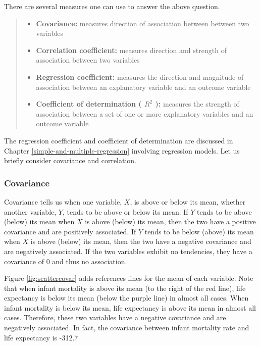 \documentclass[
]{book}
\providecommand{\tightlist}{%
  \setlength{\itemsep}{0pt}\setlength{\parskip}{0pt}}
\begin{document}
There are several measures one can use to answer the above question.

\begin{quote}
\begin{itemize}
\tightlist
\item
  \textbf{Covariance:} measures direction of association between between two variables
\item
  \textbf{Correlation coefficient:} measures direction and strength of association between two variables
\item
  \textbf{Regression coefficient:} measures the direction and magnitude of association between an explanatory variable and an outcome variable
\item
  \textbf{Coefficient of determination ( \(R^2\) ):} measures the strength of association between a set of one or more explanatory variables and an outcome variable
\end{itemize}
\end{quote}

The regression coefficient and coefficient of determination are discussed in Chapter \ref{simple-and-multiple-regression} involving regression models. Let us briefly consider covariance and correlation.

\hypertarget{covariance}{%
\subsubsection*{Covariance}\label{covariance}}

Covariance tells us when one variable, \(X\), is above or below its mean, whether another variable, \(Y\), tends to be above or below its mean. If \(Y\) tends to be above (below) its mean when \(X\) is above (below) its mean, then the two have a positive covariance and are positively associated. If \(Y\) tends to be below (above) its mean when \(X\) is above (below) its mean, then the two have a negative covariance and are negatively associated. If the two variables exhibit no tendencies, they have a covariance of 0 and thus no association.

Figure \ref{fig:scattercovar} adds references lines for the mean of each variable. Note that when infant mortality is above its mean (to the right of the red line), life expectancy is below its mean (below the purple line) in almost all cases. When infant mortality is below its mean, life expectancy is above its mean in almost all cases. Therefore, these two variables have a negative covariance and are negatively associated. In fact, the covariance between infant mortality rate and life expectancy is -312.7
\end{document}
